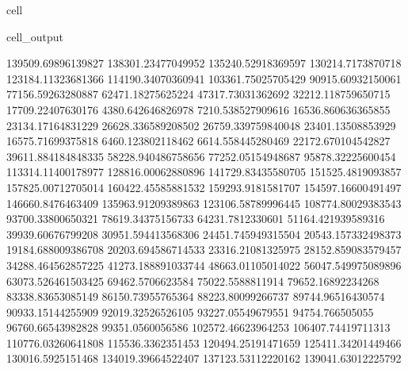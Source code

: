 \documentclass[letterpaper,10pt,english]{jupyterBook}
\begin{document}
\begin{sphinxuseclass}{cell}
\begin{sphinxVerbatimOutput}
\begin{sphinxuseclass}{cell_output}
\begin{sphinxVerbatim}[commandchars=\\\{\}]
139509.69896139827  138301.23477049952  135240.52918369597  130214.7173870718  123184.11323681366  114190.34070360941  103361.75025705429  90915.60932150061  77156.59263280887  62471.18275625224  47317.73031362692  32212.118759650715  17709.22407630176  4380.642646826978  \PYGZhy{}7210.538527909616  \PYGZhy{}16536.860636365855  \PYGZhy{}23134.17164831229  \PYGZhy{}26628.336589208502  \PYGZhy{}26759.339759840048  \PYGZhy{}23401.13508853929  \PYGZhy{}16575.71699375818  \PYGZhy{}6460.123802118462  6614.558445280469  22172.670104542827  39611.884184848335  58228.940486758656  77252.05154948687  95878.32225600454  113314.11400178977  128816.00062880896  141729.83435580705  151525.4819093857  157825.00712705014  160422.45585881532  159293.9181581707  154597.16600491497  146660.8476463409  135963.91209389863  123106.58789996445  108774.80029383543  93700.33800650321  78619.34375156733  64231.7812330601  51164.421939589316  39939.60676799208  30951.594413568306  24451.745949315504  20543.157332498373  19184.688009386708  20203.694586714533  23316.21081325975  28152.859083579457  34288.464562857225  41273.188891033744  48663.01105014022  56047.549975089896  63073.526461503425  69462.5706623584  75022.5588811914  79652.16892234268  83338.83653085149  86150.73955765364  88223.80099266737  89744.96516430574  90933.15144255909  92019.32526526105  93227.05549679551  94754.766505055  96760.66543982828  99351.0560056586  102572.46623964253  106407.74419711313  110776.03260641808  115536.3362351453  120494.25191471659  125411.34201449466  130016.5925151468  134019.39664522407  137123.53112220162  139041.63012225792  

\end{sphinxVerbatim}
\end{sphinxuseclass}
\end{sphinxVerbatimOutput}
\end{sphinxuseclass}
\end{document}
